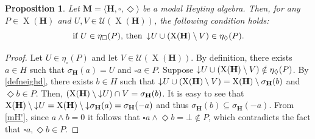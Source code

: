 \documentclass[pdflatex,sn-mathphys-num]{sn-jnl}%
\newcommand{\He}{\mathbf{H}}
\newcommand{\X}[1]{\operatorname{X}(#1)}
\newcommand{\da}[1]{\operatorname{\downarrow}\hspace{-0.5mm}{#1}}
\theoremstyle{thmstyleone}%
\newtheorem{proposition}[theorem]{Proposition}%
\theoremstyle{thmstyletwo}%
\theoremstyle{thmstylethree}%
\begin{document}

\begin{proposition}\label{propeta}
    Let $\mathbf{M}=\langle\He,\square,\Diamond\rangle$ be a modal Heyting algebra. Then, for any $P\in\X{\He}$ and $U,V\in\mathcal{U}(\X{\He})$, the following condition holds:
    \[\text{if }U\in \eta_\square(P)\text{, then }\da{U}\cup (\X{\He}\setminus V)\in \eta_\Diamond(P).\]
\end{proposition}

\begin{proof}
    Let $U\in \eta_\square(P)$ and let $V\in \mathcal{U}(\X{\He)}$. By definition, there exists $a\in H$ such that $\sigma_\He(a)=U $ and $\square a\in P$. Suppose $\da{U}\cup (\X{\He}\setminus V)\notin \eta_\Diamond(P)$. By \eqref{defneighd}, there exists $b\in H$ such that $\da{U}\cup (\X{\He}\setminus V)=\X{\He}\setminus\sigma_\He(b)$ and $\Diamond b\in P$. Then, $(\X{\He}\setminus \da{U})\cap V=\sigma_\He(b)$. It is easy to see that $\X{\He}\setminus \da{U}=\X{\He}\setminus \da{\sigma_\He(a)=\sigma_\He(-a)}$ and thus $\sigma_\He(b)\subseteq\sigma_\He(-a)$. From \eqref{mH'}, since $a\wedge b=0$ it follows that $\square a\wedge\Diamond b=\bot\notin P$, which contradicts the fact that $\square a,\Diamond b\in P$.
\end{proof}
\end{document}
